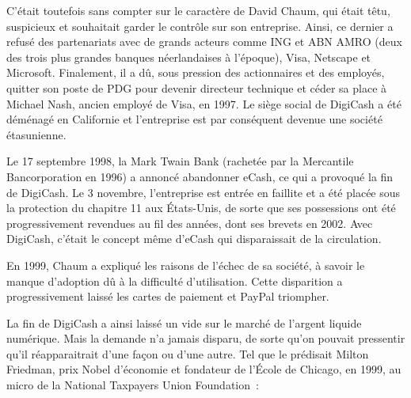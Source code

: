 C'était toutefois sans compter sur le caractère de David Chaum, qui était têtu, suspicieux et souhaitait garder le contrôle sur son entreprise. Ainsi, ce dernier a refusé des partenariats avec de grands acteurs comme ING et ABN AMRO (deux des trois plus grandes banques néerlandaises à l'époque), Visa, Netscape et Microsoft. Finalement, il a dû, sous pression des actionnaires et des employés, quitter son poste de PDG pour devenir directeur technique et céder sa place à Michael Nash, ancien employé de Visa, en 1997. Le siège social de DigiCash a été déménagé en Californie et l'entreprise est par conséquent devenue une société étasunienne.

Le 17 septembre 1998, la Mark Twain Bank (rachetée par la Mercantile Bancorporation en 1996) a annoncé abandonner eCash, ce qui a provoqué la fin de DigiCash. Le 3 novembre, l'entreprise est entrée en faillite et a été placée sous la protection du chapitre 11 aux États-Unis, de sorte que ses possessions ont été progressivement revendues au fil des années, dont ses brevets en 2002. Avec DigiCash, c'était le concept même d'eCash qui disparaissait de la circulation.

En 1999, Chaum a expliqué les raisons de l'échec de sa société, à savoir le manque d'adoption dû à la difficulté d'utilisation. Cette disparition a progressivement laissé les cartes de paiement et PayPal triompher. %

La fin de DigiCash a ainsi laissé un vide sur le marché de l'argent liquide numérique. Mais la demande n'a jamais disparu, de sorte qu'on pouvait pressentir qu'il réapparaitrait d'une façon ou d'une autre. Tel que le prédisait Milton Friedman, prix Nobel d'économie et fondateur de l'École de Chicago, en 1999, au micro de la National Taxpayers Union Foundation~:

